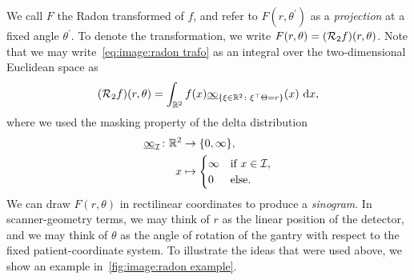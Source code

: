 \documentclass[../ml-ct.tex]{subfiles}
\begin{document}
We call \( F \) the Radon transformed of \( f \), and refer to \( F(r, \theta^\prime ) \) as a \emph{projection} at a fixed angle \( \theta^\prime \).
To denote the transformation, we write \( F(r, \theta) = (\mathcal{R}_2 f)(r, \theta) \).
Note that we may write~\cref{eq:image:radon trafo} as an integral over the two-dimensional Euclidean space as
\begin{equation}
	(\Radon f)(r, \theta) = \int_{\R^2} f(x) \indicator{\{\xi \in \R^2 \colon \xi^\top \tcs = r\}}{x}\ \dd x,%
	\label{eq:image:radon trafo euclid}
\end{equation}
where we used the masking property of the delta distribution
\begin{equation}
	\begin{aligned}
		\underline{\infty}_{\mathcal{I}}\colon\mathbb{R}^2&\to\{0, \infty\}, \\
		x &\mapsto \begin{cases}
			\infty & \text{if}\ x \in \mathcal{I}, \\
			0 & \text{else}.
		\end{cases}
	\end{aligned}
\end{equation}
We can draw \( F(r, \theta) \) in rectilinear coordinates to produce a \emph{sinogram}.
In scanner-geometry terms, we may think of \( r \) as the linear position of the detector, and we may think of \( \theta \) as the angle of rotation of the gantry with respect to the fixed patient-coordinate system.
To illustrate the ideas that were used above, we show an example in~\cref{fig:image:radon example}.
\end{document}

